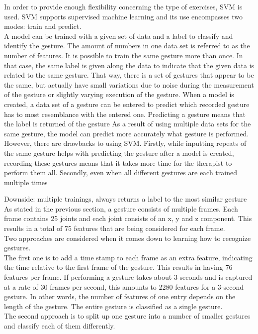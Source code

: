 In order to provide enough flexibility concerning the type of exercises, SVM is used. SVM supports supervised machine learning and its use encompasses two modes: train and predict.\\

A model can be trained with a given set of data and a label to classify and identify the gesture. The amount of numbers in one data set is referred to as the number of features. It is possible to train the same gesture more than once. In that case, the same label is given along the data to indicate that the given data is related to the same gesture. That way, there is a set of gestures that appear to be the same, but actually have small variations due to noise during the measurement of the gesture or slightly varying execution of the gesture. When a model is created, a data set of a gesture can be entered to predict which recorded gesture has to most resemblance with the entered one. Predicting a gesture means that the label is returned of the gesture As a result of using multiple data sets for the same gesture, the model can predict more accurately what gesture is performed.\\

However, there are drawbacks to using SVM. Firstly, while inputting repeats of the same gesture helps with predicting the gesture after a model is created, recording these gestures means that it takes more time for the therapist to perform them all. Secondly, even when all different gestures are each trained multiple times

Downside: multiple trainings, always returns a label to the most similar gesture\\

As stated in the previous section, a gesture consists of multiple frames. Each frame contains 25 joints and each joint consists of an x, y and z component. This results in a total of 75 features that are being considered for each frame.\\

Two approaches are considered when it comes down to learning how to recognize gestures.\\

The first one is to add a time stamp to each frame as an extra feature, indicating the time relative to the first frame of the gesture. This results in having 76 features per frame. If performing a gesture takes about 3 seconds and is captured at a rate of 30 frames per second, this amounts to 2280 features for a 3-second gesture. In other words, the number of features of one entry depends on the length of the gesture. The entire gesture is classified as a single gesture.\\

The second approach is to split up one gesture into a number of smaller gestures and classify each of them differently.